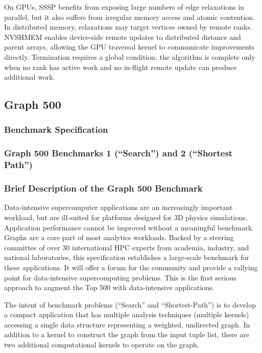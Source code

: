 \documentclass{article}
\begin{document}
On GPUs, SSSP benefits from exposing large numbers of edge relaxations in parallel, but it also suffers from irregular memory access and atomic contention. In distributed memory, relaxations may target vertices owned by remote ranks. NVSHMEM enables device-side remote updates to distributed distance and parent arrays, allowing the GPU traversal kernel to communicate improvements directly. Termination requires a global condition: the algorithm is complete only when no rank has active work and no in-flight remote update can produce additional work.

\subsection{Graph 500}
\subsubsection*{Benchmark Specification}
\subsubsection*{Graph 500 Benchmarks 1 (``Search'') and 2 (``Shortest Path'')}
\subsubsection*{Brief Description of the Graph 500 Benchmark}

Data-intensive supercomputer applications are an increasingly important workload, but are ill-suited for platforms designed for 3D physics simulations. Application performance cannot be improved without a meaningful benchmark. Graphs are a core part of most analytics workloads. Backed by a steering committee of over 30 international HPC experts from academia, industry, and national laboratories, this specification establishes a large-scale benchmark for these applications. It will offer a forum for the community and provide a rallying point for data-intensive supercomputing problems. This is the first serious approach to augment the Top 500 with data-intensive applications.

The intent of benchmark problems (``Search'' and ``Shortest-Path'') is to develop a compact application that has multiple analysis techniques (multiple kernels) accessing a single data structure representing a weighted, undirected graph. In addition to a kernel to construct the graph from the input tuple list, there are two additional computational kernels to operate on the graph.
\end{document}
